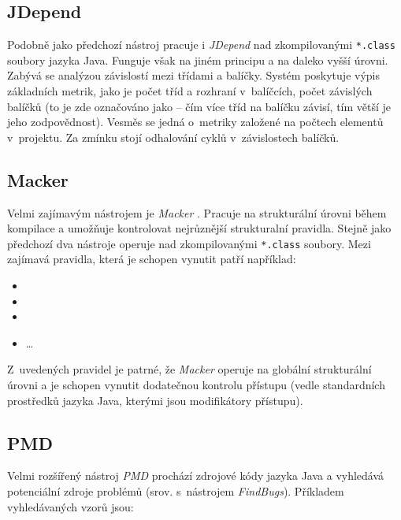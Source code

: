 \subsection{JDepend}
Podobně jako předchozí nástroj pracuje i \emph{JDepend} \cite{existingtools:jdepend} nad zkompilovanými \verb+*.class+ soubory jazyka Java. Funguje však na jiném principu a na daleko vyšší úrovni. Zabývá se analýzou závislostí mezi třídami a balíčky. Systém poskytuje výpis základních metrik, jako je počet tříd a rozhraní v~balíčcích, počet závislých balíčků (to je zde označováno jako  -- čím více tříd na balíčku závisí, tím větší je jeho zodpovědnost). Vesměs se jedná o~metriky založené na počtech elementů v~projektu. Za zmínku stojí odhalování cyklů v~závislostech balíčků.

\subsection{Macker}
Velmi zajímavým nástrojem je \emph{Macker} \cite{existingtools:macker}. Pracuje na strukturální úrovni během kompilace a umožňuje kontrolovat nejrůznější strukturalní pravidla. Stejně jako předchozí dva nástroje operuje nad zkompilovanými \verb+*.class+ soubory. Mezi zajímavá pravidla, která je schopen vynutit patří například:

\begin{itemize}
\item {}
\item {}
\item {}
\item \ldots
\end{itemize}

Z~uvedených pravidel je patrné, že \emph{Macker} operuje na globální strukturální úrovni a je schopen vynutit dodatečnou kontrolu přístupu (vedle standardních prostředků jazyka Java, kterými jsou modifikátory přístupu).

\subsection{PMD}
Velmi rozšířený nástroj \emph{PMD} \cite{existingtools:pmd} prochází zdrojové kódy jazyka Java a vyhledává potenciální zdroje problémů (srov. s~nástrojem \emph{FindBugs}). Příkladem vyhledávaných vzorů jsou:

